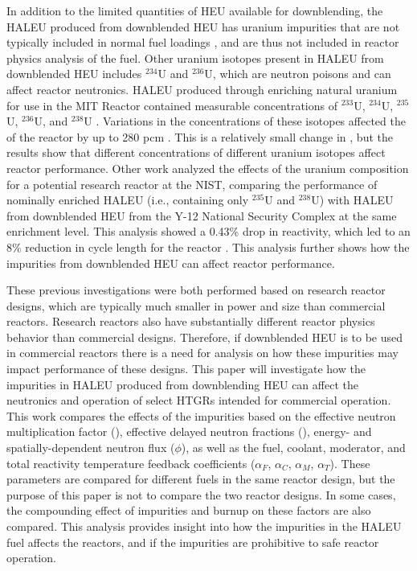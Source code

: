 In addition to the limited quantities of \gls*{HEU} available for 
downblending, the \gls*{HALEU} produced from downblended \gls*{HEU}
has uranium impurities that are not typically included in normal 
fuel loadings \cite{vaden_isotopic_2018,nelson_foreign_2010}, 
and are thus not included in reactor physics analysis of the fuel. 
Other uranium isotopes present in \gls*{HALEU} from downblended 
\gls*{HEU} includes
$^{234}$U and $^{236}$U, which are neutron poisons and 
can affect reactor neutronics. 
\gls*{HALEU} produced through enriching natural uranium for use 
in the \gls*{MIT} Reactor 
contained measurable concentrations of $^{233}$U, $^{234}$U, $^{235}$U,
$^{236}$U, and $^{238}$U \cite{mascolino_impact_2022}.
Variations in the concentrations of these isotopes affected 
the \keff of the reactor by up to 280 pcm 
\cite{mascolino_impact_2022}. 
This is a relatively small change in \keff, but the 
results show that different concentrations of different uranium 
isotopes affect reactor performance. 
Other work analyzed the effects of the uranium composition 
for a potential research reactor at the \gls*{NIST}, comparing the 
performance of nominally enriched \gls*{HALEU} (i.e., containing 
only $^{235}$U and $^{238}$U) with 
\gls*{HALEU} from downblended \gls*{HEU} from the Y-12 National 
Security Complex \cite{celikten_effects_2021} at the same 
enrichment level. This analysis 
showed a 0.43\% drop in reactivity, which led to an 8\% 
reduction in cycle length for the reactor 
\cite{celikten_effects_2021}.
This analysis further shows how the impurities from downblended 
\gls*{HEU} can affect reactor performance. 

These previous investigations were both performed based on research 
reactor designs, which are typically much smaller in power and 
size than commercial reactors. Research reactors also have 
substantially different reactor physics behavior than commercial 
designs. Therefore, if downblended 
\gls*{HEU} is to be used in commercial reactors there is a 
need for analysis
on how these impurities may impact performance of these designs. 
This paper will investigate how the 
impurities in \gls*{HALEU} produced from downblending \gls*{HEU} can 
affect the neutronics and operation of select 
\glspl*{HTGR} 
intended for commercial operation. This work compares the effects of 
the impurities based on the effective neutron 
multiplication factor 
(\keff), effective delayed neutron fractions (\betaEff), 
energy- and 
spatially-dependent neutron flux ($\phi$), as well as the fuel, 
coolant, 
moderator, and total reactivity temperature feedback coefficients
($\alpha_F$, $\alpha_C$, $\alpha_M$, $\alpha_T$). These 
parameters are compared for different fuels in the same 
reactor design, but the purpose of this paper is not 
to compare the two reactor designs. In some cases, 
the compounding effect of impurities and burnup on these 
factors are also compared. 
This analysis provides
insight into how the impurities in the \gls*{HALEU} fuel affects 
the reactors, and if the impurities are prohibitive to
safe reactor operation. 
